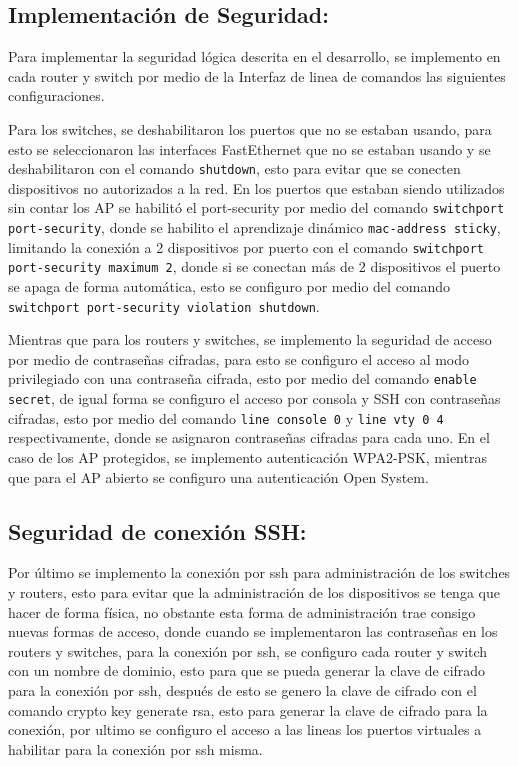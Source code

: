 \documentclass[letterpaper,11pt]{article}
\begin{document}
    \subsection{Implementación de Seguridad:}

    Para implementar la seguridad lógica descrita en el desarrollo, se implemento en cada router y switch por medio de la Interfaz de linea de comandos las siguientes configuraciones.

    Para los switches, se deshabilitaron los puertos que no se estaban usando, para esto se seleccionaron las interfaces FastEthernet que no se estaban usando y se deshabilitaron con el comando \texttt{shutdown}, esto para evitar que se conecten dispositivos no autorizados a la red. En los puertos que estaban siendo utilizados sin contar los AP se habilitó el port-security por medio del comando \texttt{switchport port-security}, donde se habilito el aprendizaje dinámico \texttt{mac-address sticky}, limitando la conexión a 2 dispositivos por puerto con el comando \texttt{switchport port-security maximum 2}, donde si se conectan más de 2 dispositivos el puerto se apaga de forma automática, esto se configuro por medio del comando \texttt{switchport port-security violation shutdown}. 

    Mientras que para los routers y switches, se implemento la seguridad de acceso por medio de contraseñas cifradas, para esto se configuro el acceso al modo privilegiado con una contraseña cifrada, esto por medio del comando \texttt{enable secret}, de igual forma se configuro el acceso por consola y SSH con contraseñas cifradas, esto por medio del comando \texttt{line console 0} y \texttt{line vty 0 4} respectivamente, donde se asignaron contraseñas cifradas para cada uno. En el caso de los AP protegidos, se implemento autenticación WPA2-PSK, mientras que para el AP abierto se configuro una autenticación Open System.
    

    \subsection{Seguridad de conexión SSH:}

    Por último se implemento la conexión por ssh para administración de los switches y routers, esto 
    para evitar que la administración de los dispositivos se tenga que hacer de forma física, no obstante 
    esta forma de administración trae consigo nuevas formas de acceso, donde cuando se implementaron las contraseñas en los routers y switches, para la conexión por ssh, se configuro cada router y switch con un nombre de dominio, esto para que se pueda generar la clave de 
    cifrado para la conexión por ssh, después de esto se genero la clave de cifrado con el comando 
    crypto key generate rsa, esto para generar la clave de cifrado para la conexión, 
    por ultimo se configuro el acceso a las lineas los puertos virtuales a habilitar para la conexión por ssh misma.
\end{document}
